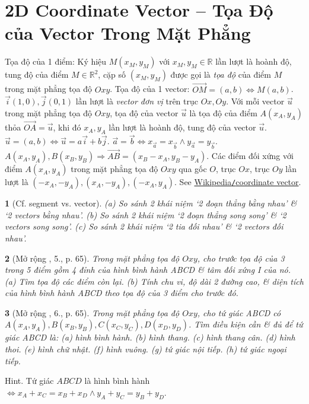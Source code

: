 \documentclass{article}
\newtheorem{baitoan}{}
\begin{document}
\section{2D Coordinate Vector -- Tọa Độ của Vector Trong Mặt Phẳng}
 {\sf Tọa độ của 1 điểm}: Ký hiệu $M(x_M,y_M)$ với $x_M,y_M\in\mathbb{R}$ lần lượt là hoành độ, tung độ của điểm $M\in\mathbb{R}^2$, cặp số $(x_M,y_M)$ được gọi là {\it tọa độ} của điểm $M$ trong mặt phẳng tọa độ $Oxy$.  {\sf Tọa độ của 1 vector}: $\overrightarrow{OM} = (a,b)\Leftrightarrow M(a,b)$. $\vec{i}(1,0),\vec{j}(0,1)$ lần lượt là {\it vector đơn vị} trên trục $Ox,Oy$. Với mỗi vector $\vec{u}$ trong mặt phẳng tọa độ $Oxy$, tọa độ của vector $\vec{u}$ là tọa độ của điểm $A(x_A,y_A)$ thỏa $\overrightarrow{OA} = \vec{u}$, khi đó $x_A,y_A$ lần lượt là hoành độ, tung độ của vector $\vec{u}$.  $\vec{u} = (a,b)\Leftrightarrow\vec{u} = a\vec{i} + b\vec{j}$.  $\vec{a} = \vec{b}\Leftrightarrow x_{\vec{a}} = x_{\vec{b}}\land y_{\vec{a}} = y_{\vec{b}}$.  $A(x_A,y_A),B(x_B,y_B)\Rightarrow\overrightarrow{AB} = (x_B - x_A,y_B - y_A)$.  Các điểm đối xứng với điểm $A(x_A,y_A)$ trong mặt phẳng tọa độ $Oxy$ qua gốc $O$, trục $Ox$, trục $Oy$ lần lượt là $(-x_A,-y_A),(x_A,-y_A),(-x_A,y_A)$. See \href{https://en.wikipedia.org/wiki/Coordinate_vector}{Wikipedia{\tt/}coordinate vector}.

\begin{baitoan}[Cf. segment vs. vector]
	(a) So sánh 2 khái niệm `2 đoạn thẳng bằng nhau' \& `2 vectors bằng nhau'. (b) So sánh 2 khái niệm `2 đoạn thẳng song song' \& `2 vectors song song'. (c) So sánh 2 khái niệm `2 tia đối nhau' \& `2 vectors đối nhau'.
\end{baitoan}

\begin{baitoan}[Mở rộng \cite{SGK_Toan_10_Canh_Dieu_tap_2}, 5., p. 65]
	Trong mặt phẳng tọa độ $Oxy$, cho trước tọa độ của 3 trong 5 điểm gồm 4 đỉnh của hình bình hành ABCD \& tâm đối xứng I của nó. (a) Tìm tọa độ các điểm còn lại. (b) Tính chu vi, độ dài 2 đường cao, \& diện tích của hình bình hành ABCD theo tọa độ của 3 điểm cho trước đó.
\end{baitoan}

\begin{baitoan}[Mở rộng \cite{SGK_Toan_10_Canh_Dieu_tap_2}, 6., p. 65]
	Trong mặt phẳng tọa độ $Oxy$, cho tứ giác ABCD có $A(x_A,y_A),B(x_B,y_B),C(x_C,y_C),D(x_D,y_D)$. Tìm điều kiện cần \& đủ để tứ giác ABCD là: (a) hình bình hành. (b) hình thang. (c) hình thang cân. (d) hình thoi. (e) hình chữ nhật. (f) hình vuông. (g) tứ giác nội tiếp. (h) tứ giác ngoại tiếp.
\end{baitoan}
{\sf Hint.} Tứ giác $ABCD$ là hình bình hành $\Leftrightarrow x_A + x_C = x_B + x_D\land y_A + y_C = y_B + y_D$.
\end{document}
